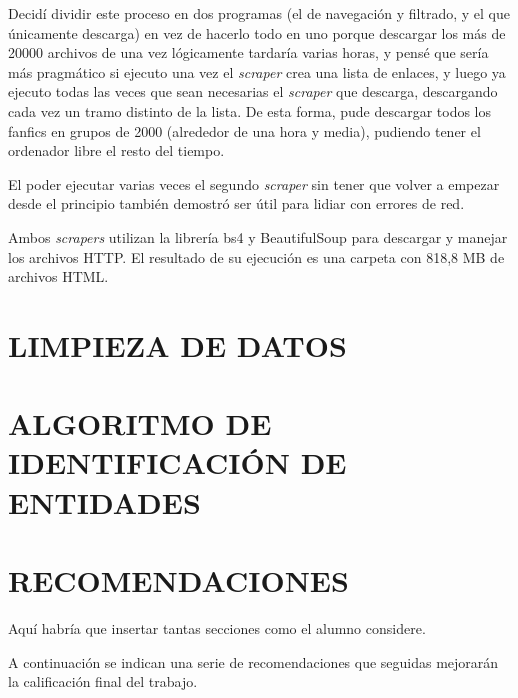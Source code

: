 \documentclass{pre-tfg}
\begin{document}
Decidí dividir este proceso en dos programas (el de navegación y filtrado, y el que únicamente descarga) en vez de hacerlo todo en uno porque descargar los más de 20000 archivos de una vez lógicamente tardaría varias horas, y pensé que sería más pragmático si ejecuto una vez el \textit{scraper} crea una lista de enlaces, y luego ya ejecuto todas las veces que sean necesarias el \textit{scraper} que descarga, descargando cada vez un tramo distinto de la lista. De esta forma, pude descargar todos los fanfics en grupos de 2000 (alrededor de una hora y media), pudiendo tener el ordenador libre el resto del tiempo.

El poder ejecutar varias veces el segundo \textit{scraper} sin tener que volver a empezar desde el principio también demostró ser útil para lidiar con errores de red.

Ambos \textit{scrapers} utilizan la librería bs4 y BeautifulSoup para descargar y manejar los archivos HTTP. El resultado de su ejecución es una carpeta con 818,8 MB de archivos HTML.

\section{LIMPIEZA DE DATOS}

\section{ALGORITMO DE IDENTIFICACIÓN DE ENTIDADES}

\section{RECOMENDACIONES}

Aquí habría que insertar tantas secciones como el alumno considere.

A continuación se indican una serie de recomendaciones que seguidas mejorarán la calificación final del trabajo.
\end{document}
